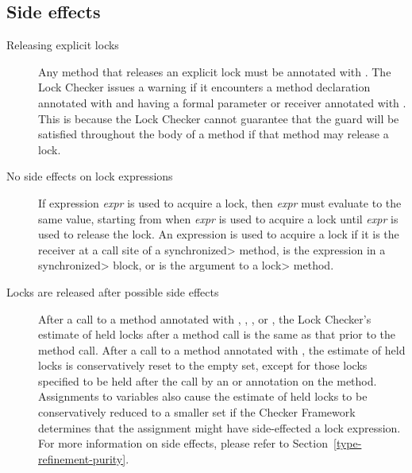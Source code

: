\subsection{Side effects\label{lock-type-checking-rules-polymorphic-side-effects}}

\begin{description}

\item[Releasing explicit locks]
  Any method that releases an explicit lock must be annotated
  with .
  The Lock Checker issues a warning if it encounters a method declaration
  annotated with  and having a formal parameter
  or receiver annotated with .  This is because
  the Lock Checker cannot guarantee that the guard will be satisfied
  throughout the body of a method if that method may release a lock.

\item[No side effects on lock expressions]
  If expression \emph{expr} is used to acquire a lock, then
  \emph{expr} must evaluate to the same value, starting from when
  \emph{expr} is used to acquire a lock until \emph{expr} is used to
  release the lock.
  An expression is used to acquire a lock if it is the receiver at a
  call site of a \<synchronized> method, is the expression in a
  \<synchronized> block, or is the argument to a \<lock> method.

\item[Locks are released after possible side effects]
  After a call to a method annotated with ,
  , , or ,
  the Lock Checker's estimate of held locks
  after a method call is the same as that prior to the method call.
  After a call to a method annotated with ,
  the estimate of held locks is conservatively reset to the empty set,
  except for those locks specified to be held after the call
  by an  or 
  annotation on the method.  Assignments to variables also
  cause the estimate of held locks to be conservatively reduced
  to a smaller set if the Checker Framework determines that the
  assignment might have side-effected a lock expression.
  For more information on side effects, please refer to
  Section~\ref{type-refinement-purity}.

\end{description}


